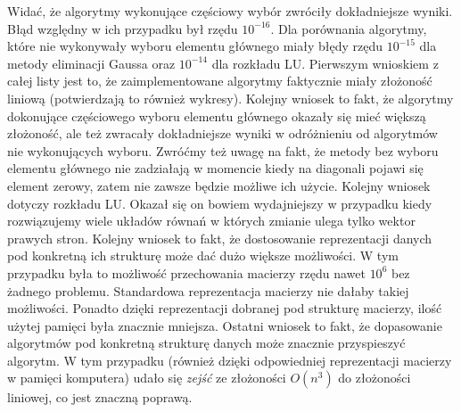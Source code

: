 \documentclass[]{article}
\begin{document}
Widać, że algorytmy wykonujące częściowy wybór zwróciły dokładniejsze wyniki. Błąd względny w ich przypadku był rzędu $10^{-16}$. Dla porównania algorytmy, które nie wykonywały wyboru elementu głównego miały błędy rzędu $10^{-15}$ dla metody eliminacji Gaussa oraz $10^{-14}$ dla rozkładu LU.
\clearpage
Pierwszym wnioskiem z całej listy jest to, że zaimplementowane algorytmy faktycznie miały złożoność liniową (potwierdzają to również wykresy). Kolejny wniosek to fakt, że algorytmy dokonujące częściowego wyboru elementu głównego okazały się mieć większą złożoność, ale też zwracały dokładniejsze wyniki w odróżnieniu od algorytmów nie wykonujących wyboru. Zwróćmy też uwagę na fakt, że metody bez wyboru elementu głównego nie zadziałają w momencie kiedy na diagonali pojawi się element zerowy, zatem nie zawsze będzie możliwe ich użycie. Kolejny wniosek dotyczy rozkładu LU. Okazał się on bowiem wydajniejszy w przypadku kiedy rozwiązujemy wiele układów równań w których zmianie ulega tylko wektor prawych stron.
Kolejny wniosek to fakt, że dostosowanie reprezentacji danych pod konkretną ich strukturę może dać dużo większe możliwości. W tym przypadku była to możliwość przechowania macierzy rzędu nawet $10^6$ bez żadnego problemu. Standardowa reprezentacja macierzy nie dałaby takiej możliwości. Ponadto dzięki reprezentacji dobranej pod strukturę macierzy, ilość użytej pamięci była znacznie mniejsza. Ostatni wniosek to fakt, że dopasowanie algorytmów pod konkretną strukturę danych może znacznie przyspieszyć algorytm. W tym przypadku (również dzięki odpowiedniej reprezentacji macierzy w pamięci komputera) udało się \textit{zejść} ze złożoności $O(n^3)$ do złożoności liniowej, co jest znaczną poprawą.
\end{document}

